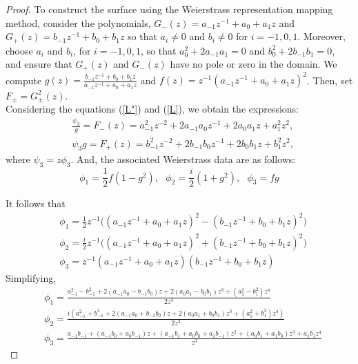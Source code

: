 \documentclass[11pt]{amsart}
\numberwithin{equation}{section}
\theoremstyle{theorem}
\theoremstyle{definition}
\numberwithin{equation}{section}
\begin{document}
\begin{proof}
To construct the surface using the Weierstrass representation mapping method, consider the polynomials, $G_-(z) = a_{-1}z^{-1} + a_0 + a_1z$ and $G_+(z) = b_{-1}z^{-1} + b_0 + b_1z$ so that $a_i\neq 0$ and $b_i\neq 0$ for $i=-1,0,1$. Moreover, choose $a_i$ and $b_i$, for $i=-1,0,1$, so that $a_0^2 + 2a_{-1}a_1 =0$ and $b_0^2 + 2b_{-1}b_1 =0$, and ensure that $G_+(z)$ and $G_-(z)$ have no pole or zero in the domain. We compute $g(z)=\frac{b_{-1}z^{-1}+b_0+b_1z}{a_{-1}z^{-1}+a_0+a_1z}$ and $f(z)=z^{-1}(a_{-1}z^{-1}+a_0+a_1z)^2$. 
Then, set $F_{\pm} = G_{\pm}^2 (z)$.\\
Considering the equations (\ref{L"}) and (\ref{L}), we obtain the expressions:
\begin{equation}
    \nonumber
    \begin{split}
    & \frac{\psi_3}{g} = F_-(z) = a_{-1}^{2}z^{-2}+2a_{-1}a_0z^{-1}+2a_0a_1z+a_1^2z^2,  \\  
   & \psi_3 g = F_+(z) = b_{-1}^{2}z^{-2}+2b_{-1}b_0z^{-1}+2b_0b_1z+b_1^2z^2,
    \end{split}
\end{equation} 
where $\psi_3 =z\phi_3$.
And, the associated Weierstrass data are as follows:
\begin{equation}
    \nonumber
        \phi_1 = \frac{1}{2} f(1-g^2),\ \ \
        \phi_2 = \frac{i}{2} (1+g^2),\ \ \
        \phi_3 = fg    
\end{equation}

It follows that
\begin{equation}
    \nonumber
    \begin{split}
       & \phi_1 = \frac{1}{2} z^{-1} \big( (a_{-1}z^{-1}+a_0+a_1z)^2 - (b_{-1}z^{-1}+b_0+b_1z)^2 \big)   \\
       & \phi_2 = \frac{i}{2} z^{-1} \big( (a_{-1}z^{-1}+a_0+a_1z)^2 + (b_{-1}z^{-1}+b_0+b_1z)^2 \big)   \\
      &  \phi_3 = z^{-1}  (a_{-1}z^{-1}+a_0+a_1z)  (b_{-1}z^{-1}+b_0+b_1z) 
    \end{split}
\end{equation}
Simplifying,
\begin{equation}
    \nonumber
    \begin{split}
       & \phi_1 = \frac{a_{-1}^2-b_{-1}^2+2(a_{-1}a_0-b_{-1}b_0)z+2(a_0a_1-b_0b_1) z^3 +(a_1^2-b_1^2)z^4}{2z^3}      \\
       & \phi_2 = \frac{i(a_{-1}^2+b_{-1}^2+2(a_{-1}a_0+b_{-1}b_0)z+2(a_0a_1+b_0b_1) z^3 +(a_1^2+b_1^2)z^4)}{2z^3}   \\
      &  \phi_3 = \frac{a_{-1}b_{-1}+(a_{-1}b_0+a_0b_{-1})z+(a_{-1}b_1+a_0b_0+a_1b_{-1})z^2+(a_0b_1+a_1b_0)z^3+a_1b_1z^4}{z^3}  
    \end{split}
\end{equation}


\end{proof}
\end{document}
